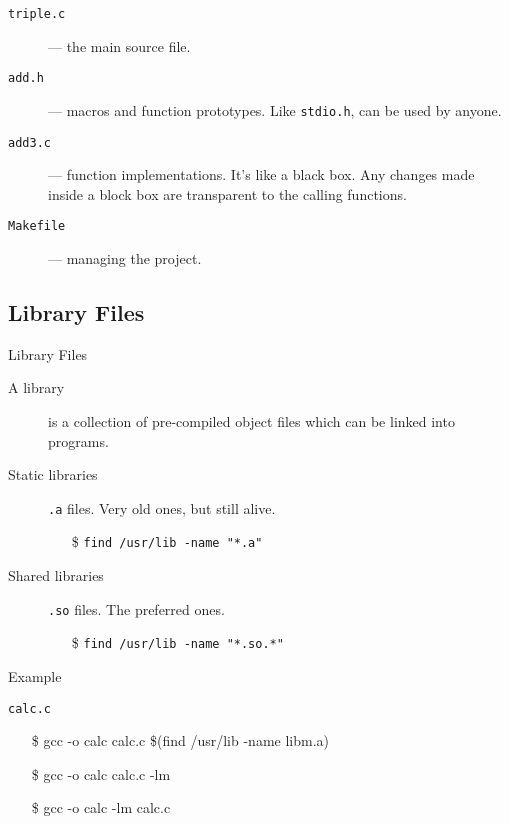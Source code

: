 \begin{description}
\item[\texttt{triple.c}] --- the main source file.
\item[\texttt{add.h}] --- macros and function prototypes. Like \texttt{stdio.h}, can be
  used by anyone.
\item[\texttt{add3.c}] --- function implementations. It's like a black box. Any changes
  made inside a block box are transparent to the calling functions.
\item[\texttt{Makefile}] --- managing the project.
\end{description}

\subsection{Library Files}
\label{sec:library-files}

\begin{frame}{Library Files}
  \begin{description}
  \item[A library] is a collection of pre-compiled object files which can be linked into programs.
  \item[Static libraries] \alert{\texttt{.a}} files. Very old ones, but still alive.
    \begin{itemize}
    \item[\$] \texttt{find /usr/lib -name "*.a"}
    \end{itemize}
  \item[Shared libraries] \alert{\texttt{.so}} files. The preferred ones.
    \begin{itemize}
    \item[\$] \texttt{find /usr/lib -name "*.so.*"}
    \end{itemize}
  \end{description}
\end{frame}

\begin{frame}{Example}
  \begin{iblock}{\texttt{calc.c}}
  \end{iblock}\ttfamily
  \begin{itemize}
  \item[\$] gcc -o calc calc.c \$(find /usr/lib -name libm.a) \correct
  \item[\$] gcc -o calc calc.c -lm \correct
  \item[\$] gcc -o calc -lm calc.c \Bad
  \end{itemize}
\end{frame}

